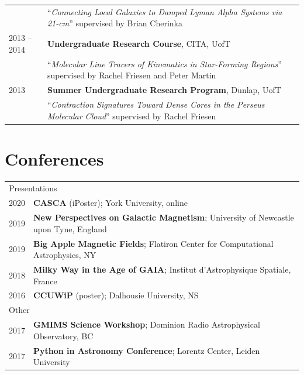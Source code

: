 \documentclass[10pt]{res} %
\begin{document}
\begin{resume}
\begin{table}[h!]
\begin{tabularx}{\textwidth}{ @{} p{6.5em} X @{} }
         & ``\textit{Connecting Local Galaxies to Damped Lyman Alpha Systems via 21-cm}'' supervised by Brian Cherinka \\
2013 -- 2014 &\textbf{Undergraduate Research Course}, CITA, UofT \\
                     & ``\textit{Molecular Line Tracers of Kinematics in Star-Forming Regions}'' supervised by Rachel Friesen and Peter Martin \\
2013 & \textbf{Summer Undergraduate Research Program}, Dunlap, UofT \\
         & ``\textit{Contraction Signatures Toward Dense Cores in the Perseus Molecular Cloud}'' supervised by Rachel Friesen
\end{tabularx}
\end{table}


\section{\Large Conferences}
\vspace{-5pt} %
\noindent\makebox[\linewidth]{\rule{\textwidth}{0.4pt}}
\vspace{-20pt} %

\begin{table}[h!]
\begin{tabularx}{\textwidth}{lX}
\multicolumn{2}{l}{ \rule{0pt}{3ex} \large \hspace{-12pt} Presentations \dotfill \rule[-1.2ex]{0pt}{0pt}} \\
2020 & \textbf{CASCA} (iPoster); York University, online \\
2019 & \textbf{New Perspectives on Galactic Magnetism}; University of Newcastle upon Tyne, England \\
2019 & \textbf{Big Apple Magnetic Fields}; Flatiron Center for Computational Astrophysics, NY \\
2018 & \textbf{Milky Way in the Age of GAIA}; Institut d'Astrophysique Spatiale, France \\
2016 & \textbf{CCUWiP} (poster); Dalhousie University, NS \\
\multicolumn{2}{l}{ \rule{0pt}{3ex} \large \hspace{-12pt} Other \dotfill \rule[-1.2ex]{0pt}{0pt}}  \\
2017 & \textbf{GMIMS Science Workshop}; Dominion Radio Astrophysical Observatory, BC \\
2017 & \textbf{Python in Astronomy Conference}; Lorentz Center, Leiden University 
\end{tabularx}
\end{table}


\end{resume}
\end{document}
